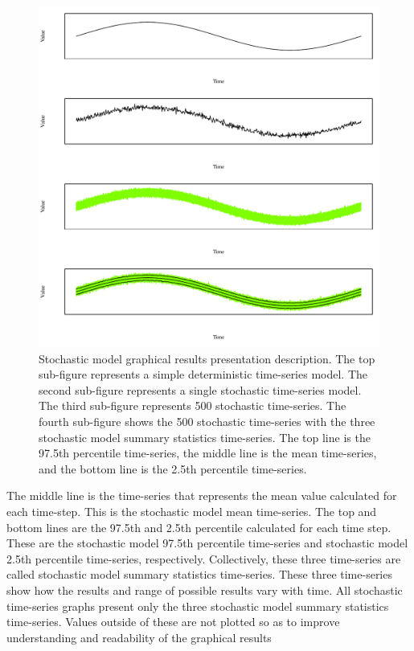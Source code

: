 \begin{linenumbers}
\begin{figure}[htbp]
	\centering
	\includegraphics[width=0.9\linewidth]{"Figures/LineDiagram/TSDescription"}
	\caption[Stochastic model graphical results presentation description.]{Stochastic model graphical results presentation description.  The top sub-figure represents a simple deterministic time-series model.  The second sub-figure represents a single stochastic time-series model.  The third sub-figure represents 500 stochastic time-series.  The fourth sub-figure shows the 500 stochastic time-series with the three stochastic model summary statistics time-series.  The top line is the 97.5th percentile time-series, the middle line is the mean time-series, and the bottom line is the 2.5th percentile time-series.}
	\label{fig:StochExample}
\end{figure}

The middle line is the time-series that represents the mean value calculated for each time-step.  This is the stochastic model mean time-series.  The top and bottom lines are the 97.5th and 2.5th percentile calculated for each time step.  These are the stochastic model 97.5th percentile time-series and stochastic model 2.5th percentile time-series, respectively.  Collectively, these three time-series are called stochastic model summary statistics time-series.  These three time-series show how the results and range of possible results vary with time.  All stochastic time-series graphs present only the three stochastic model summary statistics time-series.  Values outside of these are not plotted so as to improve understanding and readability of the graphical results


\end{linenumbers}
